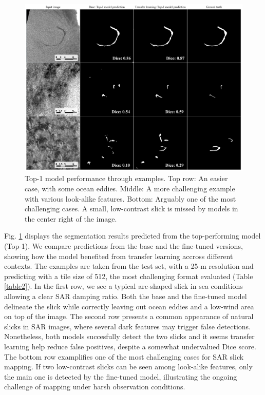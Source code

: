 \documentclass[journal]{IEEEtran}
\begin{document}
\begin{figure}[!t]
    \centering
    \includegraphics[width=6.2in]{figures/preds4x3_v2_scale.png}
    \caption{Top-1 model performance through examples. \quad Top row: An easier case, with some ocean eddies. \quad Middle: A more challenging example with 
    various look-alike features. \quad Bottom: Arguably one of the most challenging cases. A small, low-contrast slick is missed by models in the center right of the image.}
    \label{figure3}
\end{figure}
Fig. \ref{figure3} displays the segmentation results predicted from the top-performing model (Top-1). We compare predictions from the base and the fine-tuned
versions, showing how the model benefited from transfer learning accross different contexts. The examples are taken from the test set, with a 25-m resolution and predicting 
with a tile size of 512, the most challenging format evaluated (Table \ref{table2}). In the first row, we see a typical arc-shaped slick in sea conditions allowing a clear SAR damping ratio. 
Both the base and the fine-tuned model delineate the slick while correctly leaving out ocean eddies and a low-wind area on top of the image. The second row presents a common appearance 
of natural slicks in SAR images, where several dark features may trigger false detections. Nonetheless, both models succesfully detect the two slicks and it seems transfer learning help reduce
false positives, despite a somewhat undervalued Dice score. The bottom row examplifies one of the most challenging cases for SAR slick mapping. If two low-contrast slicks can be seen among look-alike features,
only the main one is detected by the fine-tuned model, illustrating the ongoing challenge of mapping under harsh observation conditions. 
\end{document}
